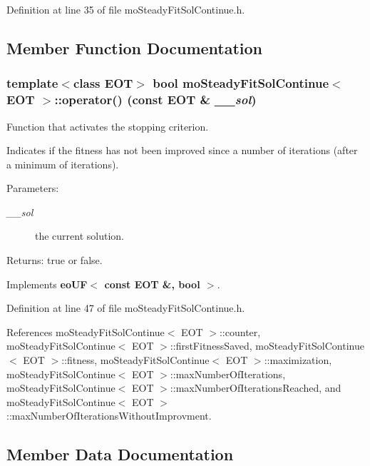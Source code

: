 Definition at line 35 of file moSteadyFitSolContinue.h.

\subsection{Member Function Documentation}
\subsubsection{\setlength{\rightskip}{0pt plus 5cm}template$<$class EOT$>$ bool {\bf moSteadyFitSolContinue}$<$ EOT $>$::operator() (const EOT \& {\em \_\-\_\-sol})\hspace{0.3cm}{\tt  [inline, virtual]}}\label{classmo_steady_fit_sol_continue_942e58ec00bb61000a83c80176e14bc3}


Function that activates the stopping criterion. 

Indicates if the fitness has not been improved since a number of iterations (after a minimum of iterations).

\begin{Desc}
\item[Parameters:]
\begin{description}
\item[{\em \_\-\_\-sol}]the current solution. \end{description}
\end{Desc}
\begin{Desc}
\item[Returns:]true or false. \end{Desc}


Implements {\bf eoUF$<$ const EOT \&, bool $>$}.

Definition at line 47 of file moSteadyFitSolContinue.h.

References moSteadyFitSolContinue$<$ EOT $>$::counter, moSteadyFitSolContinue$<$ EOT $>$::firstFitnessSaved, moSteadyFitSolContinue$<$ EOT $>$::fitness, moSteadyFitSolContinue$<$ EOT $>$::maximization, moSteadyFitSolContinue$<$ EOT $>$::maxNumberOfIterations, moSteadyFitSolContinue$<$ EOT $>$::maxNumberOfIterationsReached, and moSteadyFitSolContinue$<$ EOT $>$::maxNumberOfIterationsWithoutImprovment.

\subsection{Member Data Documentation}
